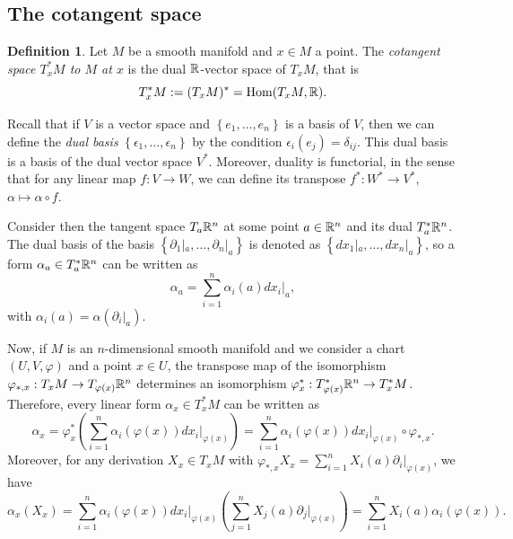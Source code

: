 \documentclass[11pt,a4paper]{book}
\theoremstyle{remark} \newtheorem{rmk}[thm]{Remark}
\theoremstyle{definition} \newtheorem{defn}[thm]{Definition}
\theoremstyle{definition} \newtheorem{ex}[thm]{Example}
\theoremstyle{definition} \newtheorem{ej}[thm]{Exercise}
\begin{document}
\subsection{The cotangent space}
\begin{defn}
  Let $M$ be a smooth manifold and $x\in M$ a point. The \emph{cotangent space $T^*_xM$ to $M$ at $x$} is the dual $\mathbb R$-vector space of $T_xM$, that is
  \begin{equation*}
T_x^*M := (T_xM)^* = \mathrm{Hom}(T_xM,\mathbb R).
  \end{equation*}
\end{defn}

Recall that if $V$ is a vector space and $\left\{ e_1,\dots,e_n \right\}$ is a basis of $V$, then we can define the \emph{dual basis} $\left\{ \epsilon_1,\dots,\epsilon_n \right\}$ by the condition $\epsilon_i(e_j)=\delta_{ij}$. This dual basis is a basis of the dual vector space $V^*$. Moreover, duality is functorial, in the sense that for any linear map $f:V\rightarrow W$, we can define its transpose $f^*:W^* \rightarrow V^*$, $\alpha \mapsto \alpha \circ f$.

Consider then the tangent space $T_a \mathbb R^n$ at some point $a \in \mathbb R^n$ and its dual $T^*_a \mathbb R^n$. The dual basis of the basis $\left\{ \partial_1|_a,\dots,\partial_n|_a \right\}$ is denoted as $\left\{ dx_1|_a,\dots,dx_n|_a \right\}$, so a form $\alpha_a \in T^*_a \mathbb R^n$ can be written as
\begin{equation*}
\alpha_a = \sum_{i=1}^n \alpha_i(a) dx_i|_a,
\end{equation*}
with $\alpha_i(a) = \alpha(\partial_i|_a)$.

Now, if $M$ is an $n$-dimensional smooth manifold and we consider a chart $(U,V,\varphi)$ and a point $x\in U$, the transpose map of the isomorphism $\varphi_{*,x}:T_xM\rightarrow T_{\varphi(x)}\mathbb R^n$ determines an isomorphism $\varphi^*_x: T_{\varphi(x)}^* \mathbb R^n\rightarrow T_x^*M$. Therefore, every linear form $\alpha_x \in T^*_xM$ can be written as
\begin{equation*}
\alpha_x = \varphi^*_x\left(\sum_{i=1}^n \alpha_i(\varphi(x))dx_i|_{\varphi(x)}\right) = \sum_{i=1}^n \alpha_i(\varphi(x)) dx_i|_{\varphi(x)} \circ \varphi_{*,x}.
\end{equation*}
Moreover, for any derivation $X_x\in T_xM$ with $\varphi_{*,x}X_x=\sum_{i=1}^n X_i(a) \partial_i|_{\varphi(x)}$, we have
\begin{equation*}
\alpha_x(X_x) = \sum_{i=1}^n \alpha_i(\varphi(x)) dx_i|_{\varphi(x)} \left( \sum_{j=1}^n X_j(a) \partial_j|_{\varphi(x)} \right) = \sum_{i=1}^n X_i(a) \alpha_i(\varphi(x)).
\end{equation*}
\end{document}
